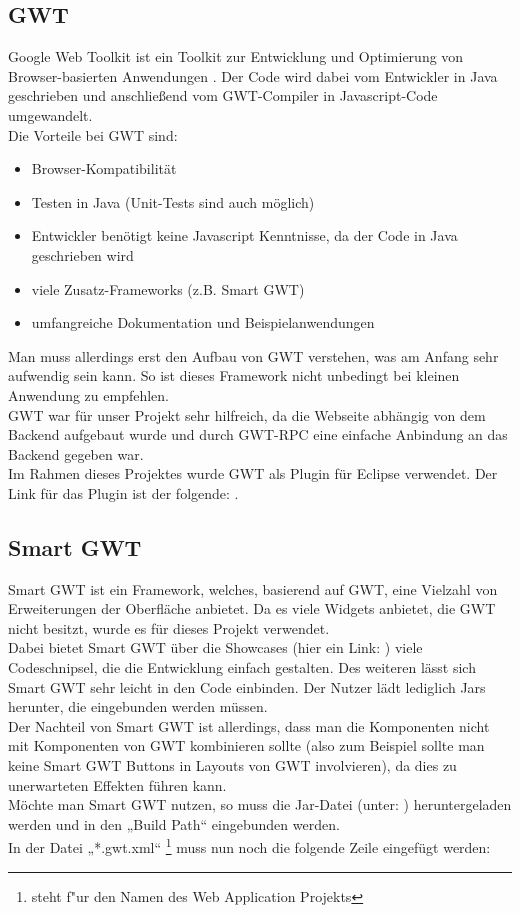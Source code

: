 \documentclass[12pt,a4paper,twoside]{article}
\begin{document}
\subsection{GWT \cite{gwt}}
Google Web Toolkit ist ein Toolkit zur Entwicklung und Optimierung von Browser-basierten Anwendungen \cite{gwt}. Der Code wird dabei vom Entwickler in Java geschrieben und anschließend vom GWT-Compiler in Javascript-Code umgewandelt. \\
Die Vorteile bei GWT sind:
\begin{itemize}
 \item Browser-Kompatibilität
 \item Testen in Java (Unit-Tests sind auch möglich)
 \item Entwickler benötigt keine Javascript Kenntnisse, da der Code in Java geschrieben wird
 \item viele Zusatz-Frameworks (z.B. Smart GWT)
 \item umfangreiche Dokumentation und Beispielanwendungen
\end{itemize}

Man muss allerdings erst den Aufbau von GWT verstehen, was am Anfang sehr aufwendig sein kann. So ist dieses Framework nicht unbedingt bei kleinen Anwendung zu empfehlen. \\
GWT war für unser Projekt sehr hilfreich, da die Webseite abhängig von dem Backend aufgebaut wurde und durch GWT-RPC eine einfache Anbindung an das Backend gegeben war.\\
\newline
Im Rahmen dieses Projektes wurde GWT als Plugin für Eclipse verwendet. Der Link für das Plugin ist der folgende: \cite{gwtplugin}.

\subsection{Smart GWT}
Smart GWT ist ein Framework, welches, basierend auf GWT, eine Vielzahl von Erweiterungen der Oberfläche anbietet. Da es viele Widgets anbietet, die GWT nicht besitzt, wurde es für dieses Projekt verwendet.\\
Dabei bietet Smart GWT über die Showcases (hier ein Link: \cite{smartgwt}) viele Codeschnipsel, die die Entwicklung  einfach gestalten. Des weiteren lässt sich Smart GWT sehr leicht in den Code einbinden. Der Nutzer lädt lediglich Jars herunter, die eingebunden werden müssen. \\
Der Nachteil von Smart GWT ist allerdings, dass man die Komponenten nicht mit Komponenten von GWT kombinieren sollte (also zum Beispiel sollte man keine Smart GWT Buttons in Layouts von GWT involvieren), da dies zu unerwarteten Effekten führen kann.\\
\newline
Möchte man Smart GWT nutzen, so muss die Jar-Datei (unter: \cite{smartgwtdown}) heruntergeladen werden und in den „Build Path“ eingebunden werden.\\
In der Datei „*.gwt.xml“ \footnote{steht f"ur den Namen des Web Application Projekts} muss nun noch die folgende Zeile eingefügt werden:
\end{document}
